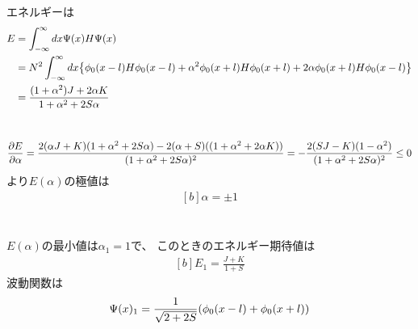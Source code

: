 \documentclass[../../master.tex]{subfiles}
\begin{document}
\section{}
エネルギーは
\begin{equation}\begin{aligned}[b]
    E &= \int_{-\infty}^{\infty}dx \Psi(x)H\Psi(x)\\
    &= N^2\int_{-\infty}^{\infty}dx\qty{\phi_0(x-l)H\phi_0(x-l)+\alpha^2\phi_0(x+l)H\phi_0(x+l)+2\alpha\phi_0(x+l)H\phi_0(x-l)}\\
    &= \frac{(1+\alpha^2)J+2\alpha K}{1+\alpha^2+2S\alpha}
\end{aligned}\end{equation}

\section{}
\begin{equation}\begin{aligned}[b]
    \pdv{E}{\alpha}
    =\frac{2(\alpha J+K)(1+\alpha^2+2S\alpha)-2(\alpha + S)((1+\alpha^2+2\alpha K))}{(1+\alpha^2+2S\alpha)^2}
    = -\frac{2(SJ-K)(1-\alpha^2)}{(1+\alpha^2+2S\alpha)^2} \le 0
\end{aligned}\end{equation}
より\(E(\alpha)\)の極値は
\begin{equation}\begin{aligned}[b]
    \alpha = \pm 1
\end{aligned}\end{equation}

\section{}
\(E(\alpha)\)の最小値は\(\alpha_1=1\)で、
このときのエネルギー期待値は
\begin{equation}\begin{aligned}[b]
    E_1 = \frac{J+K}{1+S}
\end{aligned}\end{equation}
波動関数は
\begin{equation}\begin{aligned}[b]
    \Psi(x)_1=\frac{1}{\sqrt{2+2S}}\qty(\phi_0(x-l)+\phi_0(x+l))
\end{aligned}\end{equation}
\end{document}
